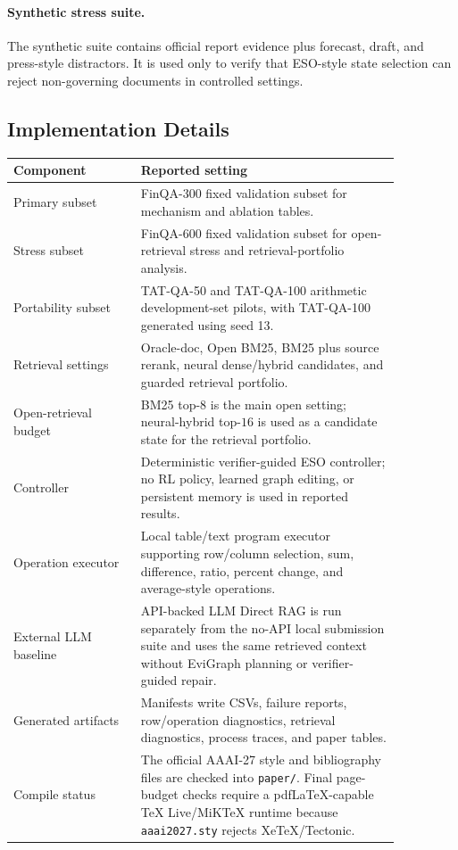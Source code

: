 \paragraph{Synthetic stress suite.}
The synthetic suite contains official report evidence plus forecast, draft, and
press-style distractors.  It is used only to verify that ESO-style state
selection can reject non-governing documents in controlled settings.

\subsection{Implementation Details}

\begin{center}
\small
\begin{tabular}{p{0.28\linewidth}p{0.58\linewidth}}
\hline
Component & Reported setting \\
\hline
Primary subset & FinQA-300 fixed validation subset for mechanism and ablation
tables. \\
Stress subset & FinQA-600 fixed validation subset for open-retrieval stress and
retrieval-portfolio analysis. \\
Portability subset & TAT-QA-50 and TAT-QA-100 arithmetic development-set
pilots, with TAT-QA-100 generated using seed 13. \\
Retrieval settings & Oracle-doc, Open BM25, BM25 plus source rerank, neural
dense/hybrid candidates, and guarded retrieval portfolio. \\
Open-retrieval budget & BM25 top-\(8\) is the main open setting; neural-hybrid
top-\(16\) is used as a candidate state for the retrieval portfolio. \\
Controller & Deterministic verifier-guided ESO controller; no RL policy,
learned graph editing, or persistent memory is used in reported results. \\
Operation executor & Local table/text program executor supporting row/column
selection, sum, difference, ratio, percent change, and average-style operations. \\
External LLM baseline & API-backed LLM Direct RAG is run separately from the
no-API local submission suite and uses the same retrieved context without
EviGraph planning or verifier-guided repair. \\
Generated artifacts & Manifests write CSVs, failure reports, row/operation
diagnostics, retrieval diagnostics, process traces, and paper tables. \\
Compile status & The official AAAI-27 style and bibliography files are checked
into \texttt{paper/}.  Final page-budget checks require a pdfLaTeX-capable
TeX Live/MiKTeX runtime because \texttt{aaai2027.sty} rejects XeTeX/Tectonic. \\
\hline
\end{tabular}
\end{center}

